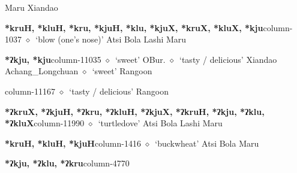          Maru 
\hspace{1ex}
         Xiandao 
  \item {\footnotesize \textbf{*kruH, *kluH, *kru, *kjuH, *klu, *kjuX, *kruX, *kluX, *kju}}{\tiny column-1037}
         $\diamond$~`blow (one's nose)'
         Atsi 
\hspace{1ex}
         Bola 
\hspace{1ex}
         Lashi 
\hspace{1ex}
         Maru 
  \item {\footnotesize \textbf{*ʔkju, *kju}}{\tiny column-11035}
         $\diamond$~`sweet'
         OBur. 
\hspace{1ex}
         $\diamond$~`tasty / delicious'
         Xiandao 
\hspace{1ex}
         Achang\_Longchuan 
\hspace{1ex}
         $\diamond$~`sweet'
         Rangoon 
  \item {\footnotesize \textbf{}}{\tiny column-11167}
         $\diamond$~`tasty / delicious'
         Rangoon 
  \item {\footnotesize \textbf{*ʔkruX, *ʔkjuH, *ʔkru, *ʔkluH, *ʔkjuX, *ʔkruH, *ʔkju, *ʔklu, *ʔkluX}}{\tiny column-11990}
         $\diamond$~`turtledove'
         Atsi 
\hspace{1ex}
         Bola 
\hspace{1ex}
         Lashi 
\hspace{1ex}
         Maru 
  \item {\footnotesize \textbf{*kruH, *kluH, *kjuH}}{\tiny column-1416}
         $\diamond$~`buckwheat'
         Atsi 
\hspace{1ex}
         Bola 
\hspace{1ex}
         Maru 
  \item {\footnotesize \textbf{*ʔkju, *ʔklu, *ʔkru}}{\tiny column-4770}

